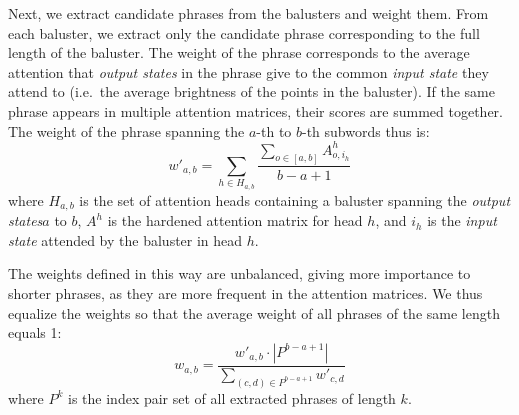 \documentclass[11pt,a4paper]{article}
\newcommand\ie{i.e.\ }
\newcommand{\word}{\emph{input state}\xspace}
\newcommand{\state}{\emph{output state}\xspace}
\newcommand{\states}{\emph{output states}\xspace}
\def\RR#1{{\color{blue}RR: \it #1}}
\def\DM#1{{\color{red}DM: \it #1}}
\def\JL#1{{\color{magenta}JL: \it #1}}
\def\JLrepl#1#2{{\color{magenta}JL: \sout{#1} \it #2}}
\def\JL#1{}
\def\JLrepl#1#2{}
\def\RR#1{}
\def\DM#1{}
\begin{document}
Next, we extract candidate phrases from the balusters and weight them.
From each baluster, we extract only the candidate phrase corresponding to the full length of the baluster.
The weight of the phrase corresponds to the average attention that \states in the phrase give to the common \word they attend to (\ie the average brightness of the points in the baluster).
If the same phrase appears in multiple attention matrices,
their scores are summed together.
The weight of the phrase spanning the $a$-th to $b$-th subwords thus is:
\begin{equation}
w'_{a,b} = \sum_{h \in H_{a,b}} \frac{\sum_{o \in [a, b]} A^h_{o, i_h}}{b - a + 1}
\end{equation}
where $H_{a,b}$ is the set of attention heads containing a baluster
spanning the \states $a$ to $b$,
$A^h$ is the hardened attention matrix for head $h$, and $i_h$ is the \word attended by the baluster in head $h$.

The weights defined in this way are unbalanced, giving more importance to shorter phrases, as they are more frequent in the attention matrices.
We thus equalize the weights so that the average weight of all phrases of the same length equals 1:
\begin{equation}
w_{a, b} =  \frac{w'_{a, b} \cdot |P^{b-a+1}|}{\sum_{(c, d) \in P^{b-a+1}} w'_{c, d}}
\end{equation}
where $P^k$ is the index pair set of all extracted phrases of length $k$.



\DM{Example of visualized phrase weights is given in Figure
TODO: vizualizace vah kandidatskych frazi.}
\end{document}
